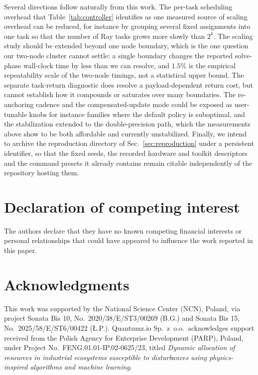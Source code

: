 \documentclass[12pt,a4paper]{elsarticle}
\begin{document}
Several directions follow naturally from this work. The per-task scheduling overhead that
Table~\ref{tab:controller} identifies as one measured source of scaling overhead can be
reduced, for instance by grouping several fixed assignments into one task so that the number
of Ray tasks grows more slowly than $2^{k}$. The scaling study should be extended beyond one
node boundary, which is the one question our two-node cluster cannot settle: a single boundary
changes the reported solve-phase wall-clock time by less than we can resolve, and $1.5\%$ is
the empirical repeatability scale of the two-node timings, not a statistical upper bound. The
separate task-return diagnostic does resolve a payload-dependent return cost, but cannot
establish how it compounds or saturates over many boundaries. The re-anchoring cadence and the
compensated-update mode could be exposed as user-tunable knobs for instance families where the
default policy is suboptimal, and the stabilization extended to the double-precision path,
which the measurements above show to be both affordable and currently unstabilized. Finally,
we intend to archive the reproduction directory of
Sec.~\ref{sec:reproduction} under a persistent identifier, so that the fixed
seeds, the recorded hardware and toolkit descriptors and the command presets it
already contains remain citable independently of the repository hosting them.

\section*{Declaration of competing interest}
The authors declare that they have no known competing financial interests or
personal relationships that could have appeared to influence the work reported
in this paper.

\section*{Acknowledgments}
This work was supported by the National Science Center (NCN), Poland, via
project Sonata Bis 10, No.~2020/38/E/ST3/00269 (B.G.) and Sonata Bis 15,
No.~2025/58/E/ST6/00422 ({\L}.P.). Quantumz.io Sp.~z~o.o.\ acknowledges
support received from the Polish Agency for Enterprise Development (PARP),
Poland, under Project No.~FENG.01.01-IP.02-0625/23, titled
\textit{Dynamic allocation of resources in industrial ecosystems susceptible
to disturbances using physics-inspired algorithms and machine learning}.



\end{document}
